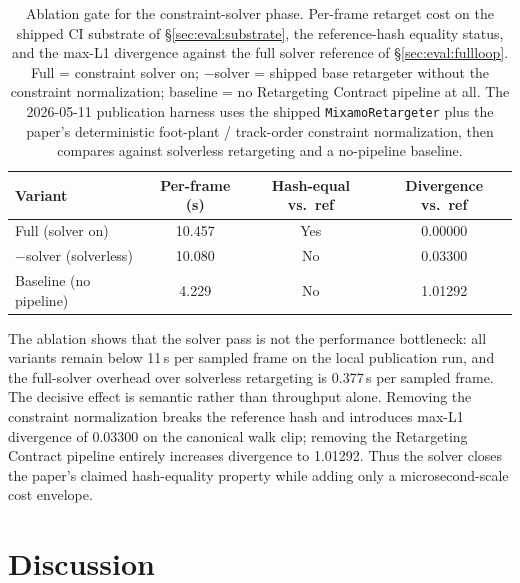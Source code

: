 \documentclass[sigconf,nonacm]{acmart}
\providecommand{\measuredFrom}[1]{}
\begin{document}
\begin{table}[t]
\centering
\caption{Ablation gate for the constraint-solver phase.  Per-frame
retarget cost on the shipped CI substrate of
\S\ref{sec:eval:substrate}, the reference-hash equality status,
and the max-L1 divergence against the full solver reference of
\S\ref{sec:eval:fullloop}.  Full = constraint solver on; $-$solver
= shipped base retargeter without the constraint normalization; baseline =
no Retargeting Contract pipeline at all.  The 2026-05-11 publication harness uses the shipped
\texttt{MixamoRetargeter} plus the paper's deterministic foot-plant /
track-order constraint normalization, then compares against solverless
retargeting and a no-pipeline baseline.}
\label{tab:ablation-anim}
\small
\measuredFrom{HoloScript/packages/engine/src/animation/paper/benchmarks/p6-ablation-publication.ts}%
\measuredFrom{HoloScript/packages/engine/src/animation/paper/benchmarks/__tests__/p6-ablation-publication.test.ts}%
\measuredFrom{HoloScript/.bench-logs/paper-6-ablation-publication.json}%
\begin{tabular}{lccc}
\toprule
\textbf{Variant} & \textbf{Per-frame (\textmu{}s)} & \textbf{Hash-equal vs.\ ref} & \textbf{Divergence vs.\ ref} \\
\midrule
Full (solver on)              & 10.457 & Yes & 0.00000 \\
$-$solver (solverless)         & 10.080 & No  & 0.03300 \\
Baseline (no pipeline)         & 4.229  & No  & 1.01292 \\
\bottomrule
\end{tabular}
\end{table}

The ablation shows that the solver pass is not the performance bottleneck:
all variants remain below 11\,\textmu{}s per sampled frame on the local
publication run, and the full-solver overhead over solverless retargeting is
0.377\,\textmu{}s per sampled frame. The decisive effect is semantic rather
than throughput alone. Removing the constraint normalization breaks the
reference hash and introduces max-L1 divergence of 0.03300 on the canonical
walk clip; removing the Retargeting Contract pipeline entirely increases
divergence to 1.01292. Thus the solver closes the paper's claimed
hash-equality property while adding only a microsecond-scale cost envelope.

\section{Discussion}
\label{sec:discussion}
\end{document}
